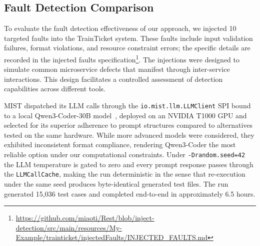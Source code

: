 \documentclass[conference]{IEEEtran}
\begin{document}


\subsection{Fault Detection Comparison}
To evaluate the fault detection effectiveness of our approach, we injected 10 targeted faults into the TrainTicket system. These faults include input validation failures, format violations, and resource constraint errors; the specific details are recorded in the injected faults specification\footnote{\url{https://github.com/miaoti/Rest/blob/inject-detection/src/main/resources/My-Example/trainticket/injectedFaults/INJECTED_FAULTS.md}}. The injections were designed to simulate common microservice defects that manifest through inter-service interactions. This design facilitates a controlled assessment of detection capabilities across different tools.

\textsc{MIST} dispatched its LLM calls through the
\texttt{io.mist.llm.LLMClient} SPI bound to a local Qwen3-Coder-30B
model~\cite{qwen2024}, deployed on an NVIDIA T1000 GPU and selected for
its superior adherence to prompt structures compared to alternatives
tested on the same hardware. While more advanced models were
considered, they exhibited inconsistent format compliance, rendering
Qwen3-Coder the most reliable option under our computational
constraints. Under \texttt{-Drandom.seed=42} the LLM temperature is
gated to zero and every prompt response passes through the
\texttt{LLMCallCache}, making the run deterministic in the sense that
re-execution under the same seed produces byte-identical generated test
files. The run generated 15{,}036 test cases and completed end-to-end in
approximately 6.5 hours.
\end{document}
